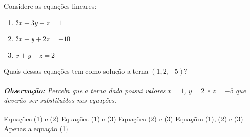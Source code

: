 Considere as equações lineares:
\begin{enumerate}[(1)]
\item $2x-3y-z=1$
\item $2x-y+2z=-10$
\item $x+y+z=2$
\end{enumerate}

Quais dessas equações tem como solução a terna $(1,2,-5)$?\\\vspace{-3mm}\\
{\it {\bf\underline{Observação}:} Perceba que a terna dada possui valores $x=1$, $y=2$ e $z=-5$ que deverão ser substituidos nas equações.}\\\vspace{-1cm}\\

Equações (1) e (2)
Equações (1) e (3)
Equações (2) e (3)
Equações (1), (2) e (3)
Apenas a equação (1)


